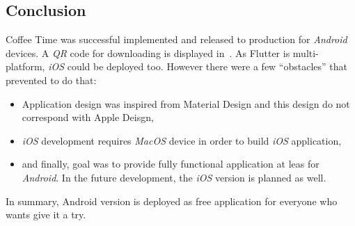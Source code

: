 \subsection{Conclusion}
Coffee Time was successful implemented and released to production for \textit{Android} devices. A \textit{QR} code for downloading is displayed in~. As Flutter is multi-platform, \textit{iOS} could be deployed too. However there were a few ``obstacles'' that prevented to do that:

\begin{itemize}
    \item Application design was inspired from Material Design and this design do not correspond with Apple Deisgn,
    \item \textit{iOS} development requires \textit{MacOS} device in order to build \textit{iOS} application,
    \item and finally, goal was to provide fully functional application at leas for \textit{Android}. In the future development, the \textit{iOS} version is planned as well. 
\end{itemize}

In summary, Android version is deployed as free application for everyone who wants give it a try. 